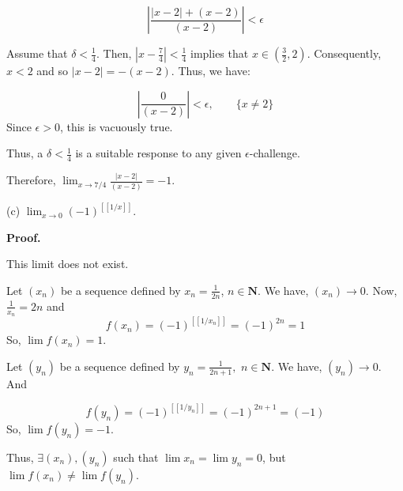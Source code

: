 \documentclass[10pt]{article}
\begin{document}
\begin{equation*}
\left| \frac{|x-2|+( x-2)}{( x-2)}\right| < \epsilon 
\end{equation*}


Assume that $\displaystyle \delta < \frac{1}{4}$. Then, $\displaystyle \left| x-\frac{7}{4}\right| < \frac{1}{4}$ implies that $\displaystyle x\in \left(\frac{3}{2} ,2\right)$. Consequently, $\displaystyle x< 2$ and so $\displaystyle |x-2|=-( x-2)$. Thus, we have:


\begin{equation*}
\left| \frac{0}{( x-2)}\right| < \epsilon ,\quad \quad \{x\neq 2\}
\end{equation*}
Since $\displaystyle \epsilon  >0$, this is vacuously true.



Thus, a $\displaystyle \delta < \frac{1}{4}$ is a suitable response to any given $\displaystyle \epsilon $-challenge.

Therefore, $\displaystyle \lim _{x\rightarrow 7/4}\frac{|x-2|}{( x-2)} =-1$.



(c) $\displaystyle \lim _{x\rightarrow 0}( -1)^{[[ 1/x]]}$.



\textbf{Proof.}



This limit does not exist.

Let $\displaystyle ( x_{n})$ be a sequence defined by $\displaystyle x_{n} =\frac{1}{2n}$, $\displaystyle n\in \mathbf{N}$. We have, $\displaystyle ( x_{n})\rightarrow 0$. Now, $\displaystyle \frac{1}{x_{n}} =2n$ and 
\begin{equation*}
f( x_{n}) =( -1)^{[[ 1/x_{n}]]} =( -1)^{2n} =1
\end{equation*}
So, $\displaystyle \lim f( x_{n}) =1$.



Let $\displaystyle ( y_{n})$ be a sequence defined by $\displaystyle y_{n} =\frac{1}{2n+1} ,$ $\displaystyle n\in \mathbf{N}$. We have, $\displaystyle ( y_{n})\rightarrow 0$. And


\begin{equation*}
f( y_{n}) =( -1)^{[[ 1/y_{n}]]} =( -1)^{2n+1} =( -1)
\end{equation*}
So, $\displaystyle \lim f( y_{n}) =-1$.



Thus, $\displaystyle \exists ( x_{n}) ,( y_{n})$ such that $\displaystyle \lim x_{n} =\lim y_{n} =0$, but $\displaystyle \lim f( x_{n}) \neq \lim f( y_{n})$.
\end{document}

